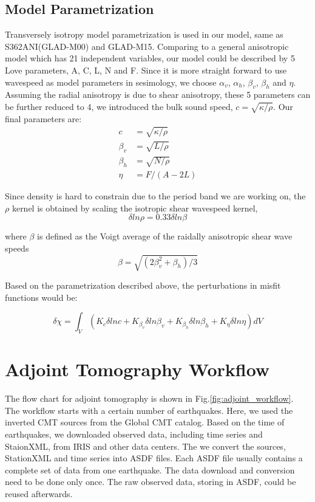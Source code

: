 \documentclass[extra,mreferee]{gji}
\begin{document}
\subsection{Model Parametrization}
Transversely isotropy model parametrization is used in our model, same as S362ANI(GLAD-M00)
and GLAD-M15. Comparing to a general anisotropic model which has 21 independent variables,
our model could be described by 5 Love parameters, A, C, L, N and F\citep{love2013treatise}.
Since it is more straight forward to use  wavespeed as model parameters in sesimology,
we choose $\alpha_v$, $\alpha_h$, $\beta_v$, $\beta_h$ and $\eta$.
Assuming the radial anisotropy is due to shear anisotropy, these 5 parameters
can be further reduced to 4, we introduced the bulk sound speed,
$c=\sqrt{\kappa/\rho}$. Our final parameters are:\\
\begin{align*}
      c &= \sqrt{\kappa/\rho} \\
\beta_v &= \sqrt{L/\rho} \\
\beta_h &= \sqrt{N/\rho} \\
\eta & = F/(A-2L)
\end{align*}

Since density is hard to constrain due to the period band we are working on, the $\rho$ kernel is obtained by scaling the isotropic shear wavespeed kernel\citep{montagner1989petrological},\\
\begin{equation*}
    \delta ln\rho = 0.33\delta ln\beta
\end{equation*}

where $\beta$ is defined as the Voigt average of the raidally anisotropic shear wave speeds\citep{babuska1991seismic}
$$\beta = \sqrt{(2\beta_v^2 + \beta_h)/3}$$

Based on the parametrization described above, the perturbations in misfit functions would be:

\begin{equation*}
    \delta \chi = \int_V
      (K_c\delta lnc + K_{\beta_v}\delta ln\beta_v + K_{\beta_h}\delta ln\beta_h +
      K_\eta \delta ln\eta) dV
\end{equation*}

\section{Adjoint Tomography Workflow}

The flow chart for adjoint tomography is shown in Fig.\ref{fig:adjoint_workflow}.
The workflow starts with a certain number of earthquakes. Here, we used the
inverted CMT sources from the Global CMT catalog. Based on the time
of earthquakes, we downloaded observed data, including time series and StaionXML,
from IRIS and other data centers. The we convert the sources, StationXML and time series
into ASDF files. Each ASDF file usually contains a complete set of data from one
earthquake. The data download and conversion need to be done only once. The raw observed data,
storing in ASDF, could be reused afterwards.
\end{document}
